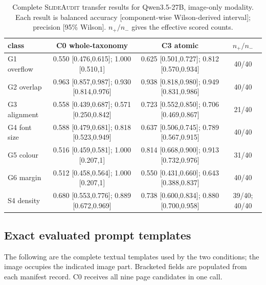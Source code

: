 \documentclass[11pt]{article}
\newcommand{\g}[1]{\textsf{#1}}
\begin{document}
\begin{table}[h]
\centering
\footnotesize
\setlength{\tabcolsep}{3.5pt}
\caption{Complete \textsc{SlideAudit} transfer results for Qwen3.5-27B,
image-only modality. Each result is balanced accuracy [component-wise Wilson-derived interval]; precision
[95\% Wilson]. $n_+/n_-$ gives the effective scored counts.}
\label{tab:slideaudit-transfer}
\begin{tabular}{@{}lccc@{}}
\toprule
class & C0 whole-taxonomy & C3 atomic & $n_+/n_-$ \\
\midrule
\g{G1} overflow & 0.550 [0.476,0.615]; 1.000 [0.510,1] & 0.625 [0.501,0.727]; 0.812 [0.570,0.934] & 40/40 \\
\g{G2} overlap  & 0.963 [0.857,0.987]; 0.930 [0.814,0.976] & 0.938 [0.818,0.980]; 0.949 [0.831,0.986] & 40/40 \\
\g{G3} alignment & 0.558 [0.439,0.687]; 0.571 [0.250,0.842] & 0.723 [0.552,0.850]; 0.706 [0.469,0.867] & 21/40 \\
\g{G4} font size & 0.588 [0.479,0.681]; 0.818 [0.523,0.949] & 0.637 [0.506,0.745]; 0.789 [0.567,0.915] & 40/40 \\
\g{G5} colour & 0.516 [0.459,0.581]; 1.000 [0.207,1] & 0.814 [0.668,0.900]; 0.913 [0.732,0.976] & 31/40 \\
\g{G6} margin & 0.512 [0.458,0.564]; 1.000 [0.207,1] & 0.550 [0.431,0.660]; 0.643 [0.388,0.837] & 40/40 \\
\g{S4} density & 0.680 [0.553,0.776]; 0.889 [0.672,0.969] & 0.738 [0.600,0.834]; 0.880 [0.700,0.958] & 39/40; 40/40 \\
\bottomrule
\end{tabular}
\end{table}

\subsection{Exact evaluated prompt templates}\label{app:slideaudit-prompts}

The following are the complete textual templates used by the two conditions;
the image occupies the indicated image part. Bracketed fields are populated
from each manifest record. C0 receives all nine page candidates in one call.
\end{document}
